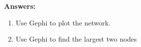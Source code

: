 \documentclass{amsart}
\theoremstyle{definition}
\theoremstyle{remark}
\numberwithin{equation}{section}
\begin{document}
\begin{enumerate}
\vspace{0.5cm}

\textbf{Answers:}

\begin{enumerate}
\item Use Gephi to plot the network. \vspace{0.2cm}

\vspace{0.2cm}
\item Use Gephi to find the largest two nodes \vspace{0.2cm}

\vspace{0.2cm}
\end{enumerate}

\end{enumerate}
\end{document}
